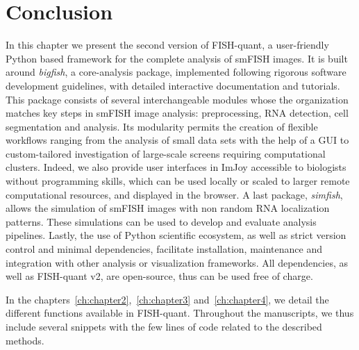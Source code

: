 \section{Conclusion}
\label{sec:conclusion}

In this chapter we present the second version of FISH-quant, a user-friendly Python based framework for the complete analysis of \ac{smFISH} images.
It is built around \emph{bigfish}, a core-analysis package, implemented following rigorous software development guidelines, with detailed interactive documentation and tutorials.
This package consists of several interchangeable modules whose the organization matches key steps in \ac{smFISH} image analysis: preprocessing, \ac{RNA} detection, cell segmentation and analysis.
Its modularity permits the creation of flexible workflows ranging from the analysis of small data sets with the help of a \ac{GUI} to custom-tailored investigation of large-scale screens requiring computational clusters.
Indeed, we also provide user interfaces in ImJoy accessible to biologists without programming skills, which can be used locally or scaled to larger remote computational resources, and displayed in the browser.
A last package, \emph{simfish}, allows the simulation of \ac{smFISH} images with non random \ac{RNA} localization patterns.
These simulations can be used to develop and evaluate analysis pipelines.
Lastly, the use of Python scientific ecosystem, as well as strict version control and minimal dependencies, facilitate installation, maintenance and integration with other analysis or visualization frameworks.
All dependencies, as well as FISH-quant v2, are open-source, thus can be used free of charge.

In the chapters~\ref{ch:chapter2},~\ref{ch:chapter3} and~\ref{ch:chapter4}, we detail the different functions available in FISH-quant.
Throughout the manuscripts, we thus include several snippets with the few lines of code related to the described methods.
